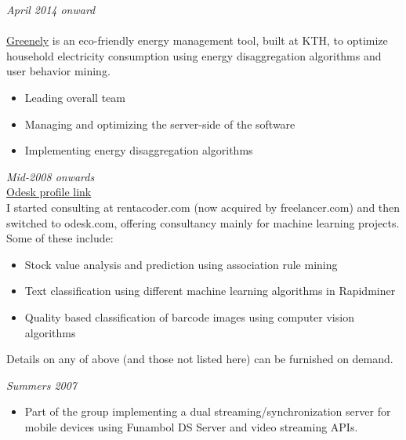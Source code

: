\documentclass[margin, 10pt]{res} %
\begin{document}
\begin{resume}
{\sl \textbf{}} \hfill \textit{April 2014 onward} \\
{\color{RubineRed}{Greenely, Sweden}} \\
\href{https://www.youtube.com/watch?v=COsyhfX7Pes}{Greenely} is an eco-friendly energy management tool, built at KTH, to optimize household electricity consumption using energy disaggregation algorithms and user behavior mining.
\begin{itemize} 
\item Leading overall team
\item Managing and optimizing the server-side of the software
\item Implementing energy disaggregation algorithms
\end{itemize} 

{\sl \textbf{}} \hfill \textit{Mid-2008 onwards} \\
{\color{RubineRed}{Odesk Corporation} \hfill \href{https://www.odesk.com/users/~013a228837c241737c}{Odesk profile link}} \\
I started consulting at rentacoder.com (now acquired by freelancer.com) and then switched to odesk.com, offering consultancy mainly for machine learning projects. Some of these include: 

\begin{itemize} \itemsep -2pt %
\item Stock value analysis and prediction using association rule mining
\item Text classification using different machine learning algorithms in Rapidminer 
\item Quality based classification of barcode images using computer vision algorithms
\end{itemize} 
Details on any of above (and those not listed here) can be furnished on demand.

{\sl \textbf{}} \hfill \textit{Summers 2007} \\
{\color{RubineRed}{Five Rivers Technologies, Lahore}}
\begin{itemize}
\item Part of the group implementing a dual streaming/synchronization server for mobile devices using Funambol DS Server and video streaming APIs.
\end{itemize} 


\end{resume}
\end{document}
